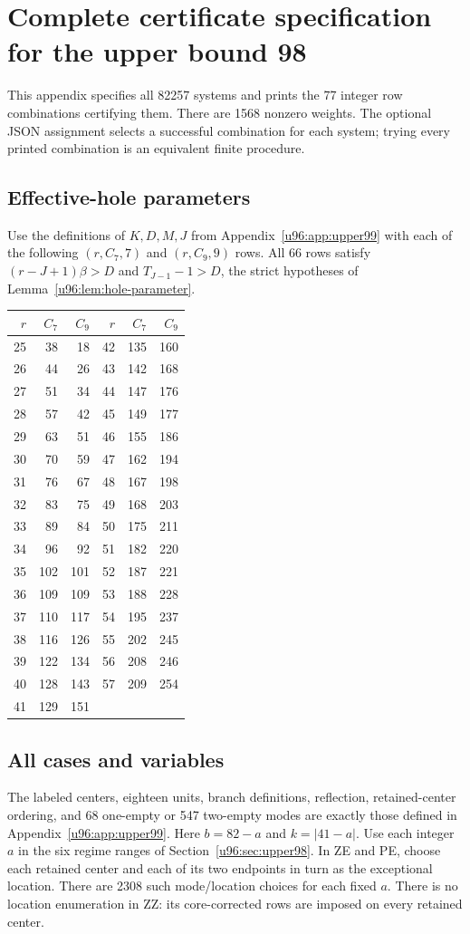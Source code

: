 \documentclass[11pt,a4paper]{article}
\theoremstyle{remark}
\begin{document}
\clearpage
\section[Certificate specification for upper bound 98]{Complete certificate specification for the upper bound 98}\label{u96:app:upper98}
This appendix specifies all 82257 systems and prints the 77 integer row
combinations certifying them. There are 1568 nonzero weights. The optional
JSON assignment selects a successful combination for each system; trying
every printed combination is an equivalent finite procedure.

\subsection{Effective-hole parameters}
Use the definitions of $K,D,M,J$ from Appendix~\ref{u96:app:upper99} with each
of the following $(r,C_7,7)$ and $(r,C_9,9)$ rows. All 66 rows satisfy
$(r-J+1)\beta>D$ and $T_{J-1}-1>D$, the strict hypotheses of
Lemma~\ref{u96:lem:hole-parameter}.
\begin{center}\small
\begin{tabular}{rrr@{\qquad}rrr}
\toprule
$r$&$C_7$&$C_9$&$r$&$C_7$&$C_9$\\\midrule
25&38&18&42&135&160\\
26&44&26&43&142&168\\
27&51&34&44&147&176\\
28&57&42&45&149&177\\
29&63&51&46&155&186\\
30&70&59&47&162&194\\
31&76&67&48&167&198\\
32&83&75&49&168&203\\
33&89&84&50&175&211\\
34&96&92&51&182&220\\
35&102&101&52&187&221\\
36&109&109&53&188&228\\
37&110&117&54&195&237\\
38&116&126&55&202&245\\
39&122&134&56&208&246\\
40&128&143&57&209&254\\
41&129&151&&&\\
\bottomrule
\end{tabular}
\end{center}

\subsection{All cases and variables}
The labeled centers, eighteen units, branch definitions, reflection,
retained-center ordering, and 68 one-empty or 547 two-empty modes are
exactly those defined in Appendix~\ref{u96:app:upper99}.
Here $b=82-a$ and $k=|41-a|$. Use each integer $a$ in the six regime
ranges of Section~\ref{u96:sec:upper98}. In ZE and PE, choose each retained
center and each of its two endpoints in turn as the exceptional location.
There are 2308 such mode/location choices for each fixed $a$.
There is no location enumeration in ZZ: its core-corrected rows are
imposed on every retained center.
\end{document}
